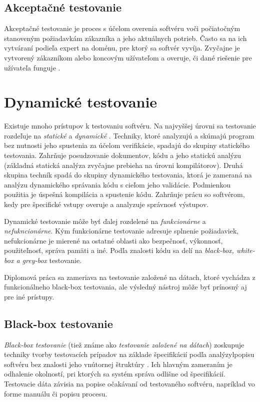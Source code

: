 \subsection*{Akceptačné testovanie}
Akceptačné testovanie je proces s účelom overenia softvéru voči počiatočným stanoveným požiadavkám zákazníka a jeho aktuálnych potrieb. Často sa na ich vytváraní podieľa expert na doménu, pre ktorý sa softvér vyvíja. Zvyčajne je vytvorený zákazníkom alebo koncovým užívateľom a overuje, či dané riešenie pre užívateľa funguje \cite{Ast}.  

\section{Dynamické testovanie}
\label{Dyn_t}
Existuje mnoho prístupov k testovaniu softvéru. Na najvyššej úrovni sa testovanie rozdeľuje na {\it statické} a {\it dynamické} \cite{Ist}. Techniky, ktoré analyzujú a skúmajú program bez nutnosti jeho spustenia za účelom verifikácie,  spadajú do skupiny statického testovania. Zahrňuje posudzovanie dokumentov, kódu a jeho statickú analýzu (základná statická analýza zvyčajne prebieha na úrovni kompilátorov). Druhá skupina techník spadá do skupiny dynamického testovania, ktorá je zameraná na analýzu dynamického správania kódu s cieľom jeho validácie. Podmienkou použitia je úspešná kompilácia a spustenie kódu. Zahrňuje prácu so softvérom, kedy pre špecifické vstupy overuje a analyzuje správnosť výstupov.

Dynamické testovanie môže byť ďalej rozdelené na {\it funkcionárne} a {\it nefukncionárne}. Kým funkcionárne testovanie adresuje splnenie požiadaviek, nefukcionárne je mierené na ostatné oblasti ako bezpečnosť, výkonnosť, použiteľnosť, správa pamäti a iné. Podľa znalosti kódu sa delí na {\it black-box, white-box a grey-box} testovanie.

Diplomová práca sa zameriava na testovanie založené na dátach, ktoré vychádza z funkcionálneho black-box testovania, ale výsledný nástroj môže byť prínosný aj pre iné prístupy.


\subsection*{Black-box testovanie}
{\it Black-box testovanie} (tiež známe ako {\it testovanie založené na dátach}) zoskupuje techniky tvorby testovacích prípadov na základe špecifikácií podľa analýzylpopisu softvéru bez znalosti jeho vnútornej štruktúry  \cite{Ast}. Ich hlavným zameraním je odhalenie okolností, pri ktorých sa systém správa odlišne od špecifikácií.  Testovacie dáta závisia na popise očakávaní od testovaného softvéru, napríklad vo forme manuálu či popisu procesu.

